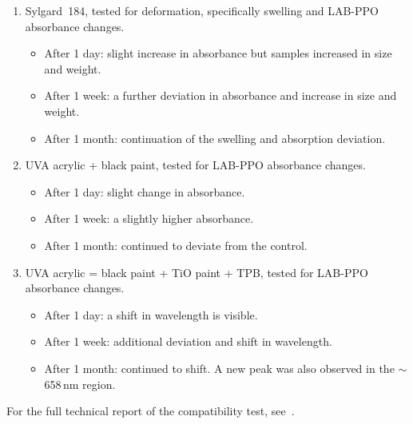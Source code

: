 \begin{enumerate}
    \item Sylgard~184, tested for deformation, specifically swelling and LAB-PPO absorbance changes.
    \begin{itemize}
        \setlength{\itemsep}{-0.2cm}
        \item After 1 day: slight increase in absorbance but samples increased in size and weight.
        \item After 1 week: a further deviation in absorbance and increase in size and weight.
        \item After 1 month: continuation of the swelling and absorption deviation. 
    \end{itemize}
    \item UVA acrylic + black paint, tested for LAB-PPO absorbance changes.
    \begin{itemize}
        \setlength{\itemsep}{-0.2cm}
        \item After 1 day: slight change in absorbance.
        \item After 1 week: a slightly higher absorbance.
        \item After 1 month: continued to deviate from the control.
    \end{itemize}
    \item UVA acrylic = black paint + TiO paint + TPB, tested for LAB-PPO absorbance changes.
    \begin{itemize}
        \setlength{\itemsep}{-0.2cm}
        \item After 1 day: a shift in wavelength is visible.
        \item After 1 week: additional deviation and shift in wavelength.
        \item After 1 month: continued to shift. A new peak was also observed in the $\sim$658\,nm region.
    \end{itemize}
\end{enumerate}
For the full technical report of the compatibility test, see~\cite{lina:2015}.

